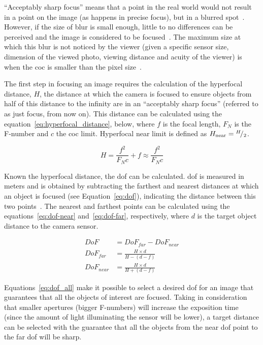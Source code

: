 ``Acceptably sharp focus'' means that a point in the real world would not result in a point on the image (as happens in precise focus), but in a blurred spot~\cite{Photopillers}. However, if the size of blur is small enough, little to no differences can be perceived and the image is considered to be focused~\cite{Photopillers}. The maximum size at which this blur is not noticed by the viewer (given a specific sensor size, dimension of the viewed photo, viewing distance and acuity of the viewer) is when the \ac{coc} is smaller than the pixel size~\cite{Photopillers, Merklinger1993}.

The first step in focusing an image requires the calculation of the hyperfocal distance, $H$, the distance at which the camera is focused to ensure objects from half of this distance to the infinity are in an ``acceptably sharp focus'' (referred to as just focus, from now on). This distance can be calculated using the equation~\eqref{eq:hyperfocal_distance}, below, where $f$ is the focal length, $F_N$ is the F-number and $c$ the \ac{coc} limit. Hyperfocal near limit is defined as $H_\text{near} = {}^{H}\!/_{2}$.

\begin{equation}
	\label{eq:hyperfocal_distance}
	H = \frac{f^2}{F_Nc} + f \approx \frac{f^2}{F_Nc} 
\end{equation}

Known the hyperfocal distance, the \acf{dof} can be calculated. \ac{dof} is measured in meters and is obtained by subtracting the farthest and nearest distances at which an object is focused (see Equation~\eqref{eq:dof}), indicating the distance between this two points~\cite{Photopillers, Merklinger1993, mvg_book}. The nearest and farthest points can be calculated using the equations~\eqref{eq:dof-near} and~\eqref{eq:dof-far}, respectively, where $d$ is the target object distance to the camera sensor.

\begin{subequations}
	\label{eq:dof_all}
	\begin{align}
		DoF & = DoF_{far} - DoF_{near} \label{eq:dof} \\
		DoF_{far} & = \frac{H\times d}{H - (d - f)} \label{eq:dof-far} \\
		DoF_{near} & = \frac{H\times d}{H + (d - f)} \label{eq:dof-near} 
	\end{align}
\end{subequations}

Equations~\eqref{eq:dof_all} make it possible to select a desired \acl{dof} for an image that guarantees that all the objects of interest are focused. Taking in consideration that smaller apertures (bigger F-numbers) will increase the exposition time~\cite{Merklinger1993} (since the amount of light illuminating the sensor will be lower), a target distance can be selected with the guarantee that all the objects from the near \ac{dof} point to the far \ac{dof} will be sharp.

